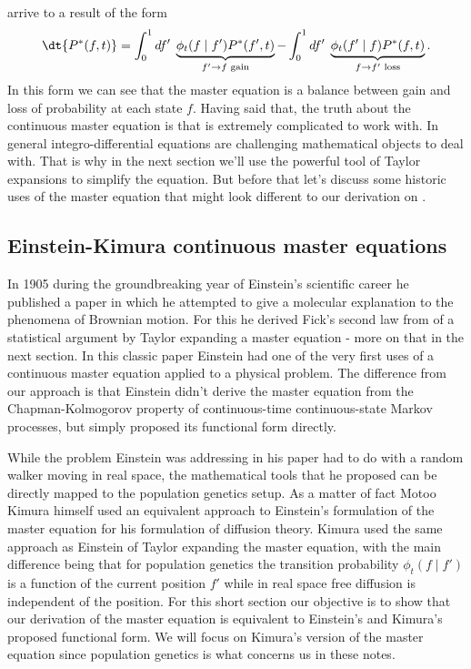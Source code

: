 arrive to a result of the form
\begin{equation}
  \dt{P^*(f, t)} = \int_0^1 df' \;
  \underbrace{
  \phi_t(f \mid f') P^*(f', t)
  }_{f' \rightarrow f \text{ gain}} -
  \int_0^1 df' \;
  \underbrace{
  \phi_t(f' \mid f) P^*(f, t)
  }_{f \rightarrow f' \text{ loss}}.
  \label{eq_master_eq_full}
\end{equation}
In this form we can see that the master equation is a balance between gain and
loss of probability at each state $f$. Having said that, the truth about the
continuous master equation is that is extremely complicated to work with. In
general integro-differential equations are challenging mathematical objects to
deal with. That is why in the next section we'll use the powerful tool of
Taylor expansions to simplify the equation. But before that let's discuss some
historic uses of the master equation that might look different to our derivation
on .

\subsection{Einstein-Kimura continuous master equations}

In 1905 during the groundbreaking year of Einstein's scientific career he
published a paper in which he attempted to give a molecular explanation to the
phenomena of Brownian motion. For this he derived Fick's second law from of a
statistical argument by Taylor expanding a master equation - more on that in
the next section. In this classic paper Einstein had one of the very first uses
of a continuous master equation applied to a physical problem. The difference
from our approach is that Einstein didn't derive the master equation from the
Chapman-Kolmogorov property of continuous-time continuous-state Markov
processes, but simply proposed its functional form directly.

While the problem Einstein was addressing in his paper had to do with a random
walker moving in real space, the mathematical tools that he proposed can be
directly mapped to the population genetics setup. As a matter of fact Motoo
Kimura himself used an equivalent approach to Einstein's formulation of the
master equation for his formulation of diffusion theory. Kimura used the same
approach as Einstein of Taylor expanding the master equation, with the main
difference being that for population genetics the transition probability
$\phi_t(f \mid f')$ is a function of the current position $f'$ while in real
space free diffusion is independent of the position. For this short section our
objective is to show that our derivation of the master equation is equivalent to
Einstein's and Kimura's proposed functional form. We will focus on Kimura's
version of the master equation since population genetics is what concerns us in
these notes.

